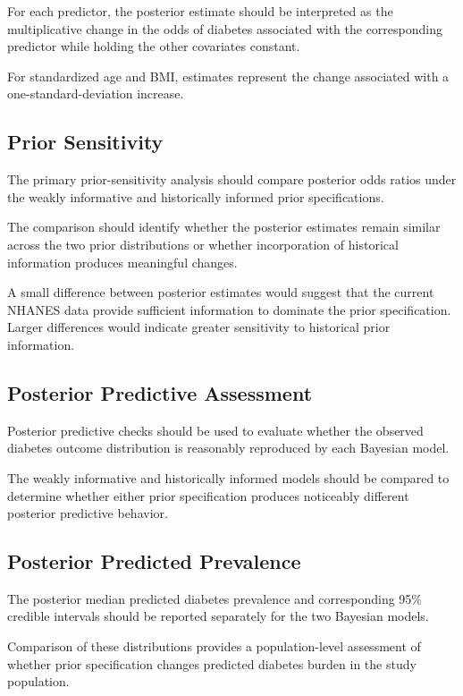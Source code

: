 \documentclass[12pt]{article}
\begin{document}
For each predictor, the posterior estimate should be interpreted as the multiplicative change in the odds of diabetes associated with the corresponding predictor while holding the other covariates constant.

For standardized age and BMI, estimates represent the change associated with a one-standard-deviation increase.

\subsection{Prior Sensitivity}

The primary prior-sensitivity analysis should compare posterior odds ratios under the weakly informative and historically informed prior specifications.

The comparison should identify whether the posterior estimates remain similar across the two prior distributions or whether incorporation of historical information produces meaningful changes.

A small difference between posterior estimates would suggest that the current NHANES data provide sufficient information to dominate the prior specification. Larger differences would indicate greater sensitivity to historical prior information.

\subsection{Posterior Predictive Assessment}

Posterior predictive checks should be used to evaluate whether the observed diabetes outcome distribution is reasonably reproduced by each Bayesian model.

The weakly informative and historically informed models should be compared to determine whether either prior specification produces noticeably different posterior predictive behavior.

\subsection{Posterior Predicted Prevalence}

The posterior median predicted diabetes prevalence and corresponding 95\% credible intervals should be reported separately for the two Bayesian models.

Comparison of these distributions provides a population-level assessment of whether prior specification changes predicted diabetes burden in the study population.
\end{document}
